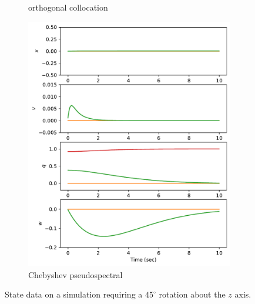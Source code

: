 \documentclass[]{article}
\begin{document}
\begin{figure}[H]
\begin{subfigure}[b]{0.3\textwidth}
		\caption{orthogonal collocation}
	\end{subfigure}%
	\begin{subfigure}[b]{0.3\textwidth}
		\centering
		\includegraphics[width=\textwidth]{figures/state45dz2.pdf}
		\caption{Chebyshev pseudospectral}
	\end{subfigure}
	\caption{State data on a simulation requiring a $45^{\circ}$ rotation about the $z$ axis.}
	\label{fig:state45z}
\end{figure}
\end{document}
